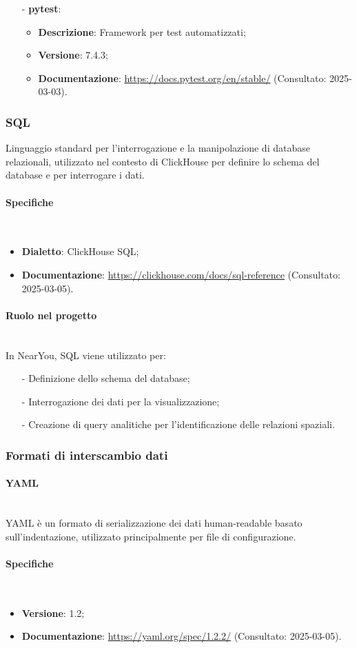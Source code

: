 \documentclass[10pt]{article}
\newcommand{\myparagraph}[1]{\paragraph{#1}\mbox{}\\}
\begin{document}
\begin{itemize}
    \item[-] \textbf{pytest}:
    \begin{itemize}
        \item \textbf{Descrizione}: Framework per test automatizzati;
        \item \textbf{Versione}: 7.4.3;
        \item \textbf{Documentazione}: \textcolor{blue}{\url{https://docs.pytest.org/en/stable/}} (Consultato: 2025-03-03).
    \end{itemize}
\end{itemize}

\subsubsection{SQL}
Linguaggio standard per l'interrogazione e la manipolazione di database relazionali, utilizzato nel contesto di ClickHouse per definire lo schema del database e per interrogare i dati.

\myparagraph{Specifiche}
\begin{itemize}
    \item \textbf{Dialetto}: ClickHouse SQL;
    \item \textbf{Documentazione}: \textcolor{blue}{\url{https://clickhouse.com/docs/sql-reference}} (Consultato: 2025-03-05).
\end{itemize}

\myparagraph{Ruolo nel progetto}
In NearYou, SQL viene utilizzato per:
\begin{itemize}
    \item[-] Definizione dello schema del database;
    \item[-] Interrogazione dei dati per la visualizzazione;
    \item[-] Creazione di query analitiche per l'identificazione delle relazioni spaziali.
\end{itemize}

\subsubsection{Formati di interscambio dati}
\myparagraph{YAML}
YAML è un formato di serializzazione dei dati human-readable basato sull'indentazione, utilizzato principalmente per file di configurazione.

\myparagraph{Specifiche}
\begin{itemize}
    \item \textbf{Versione}: 1.2;
    \item \textbf{Documentazione}: \textcolor{blue}{\url{https://yaml.org/spec/1.2.2/}} (Consultato: 2025-03-05).
\end{itemize}
\end{document}
